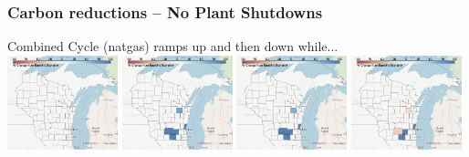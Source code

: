 \documentclass[xcolor=dvipsnames]{beamer}
\begin{document}
\begin{frame}
\end{frame}

\begin{frame}
    \frametitle{Carbon reductions -- No Plant Shutdowns}


  Combined Cycle (natgas) ramps up and then down while... \\
  \includegraphics[width=0.24\textwidth]{includes/no_leakage_no_shutdowns_CC_r0.png}
  \includegraphics[width=0.24\textwidth]{includes/no_leakage_no_shutdowns_CC_r2.png}
  \includegraphics[width=0.24\textwidth]{includes/no_leakage_no_shutdowns_CC_r3.png}
  \includegraphics[width=0.24\textwidth]{includes/no_leakage_no_shutdowns_CC_r4.png}




\end{frame}
\end{document}
